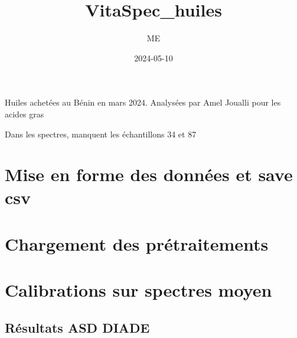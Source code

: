 \documentclass[
]{article}
\title{VitaSpec\_huiles}
\author{ME}
\date{2024-05-10}
\begin{document}
\maketitle

Huiles achetées au Bénin en mars 2024. Analysées par Amel Joualli pour
les acides gras

Dans les spectres, manquent les échantillons 34 et 87

\section{Mise en forme des données et save
csv}\label{mise-en-forme-des-donnuxe9es-et-save-csv}

\section{Chargement des
prétraitements}\label{chargement-des-pruxe9traitements}

\section{Calibrations sur spectres
moyen}\label{calibrations-sur-spectres-moyen}

\subsection{Résultats ASD DIADE}\label{ruxe9sultats-asd-diade}
\end{document}
